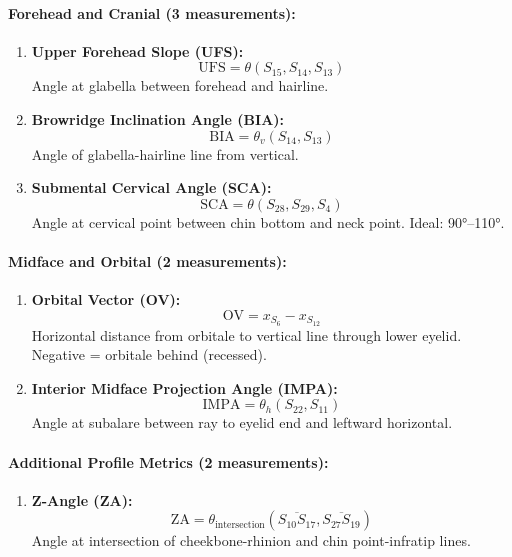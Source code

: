 \paragraph{Forehead and Cranial (3 measurements):}
\begin{enumerate}[resume]
    \item \textbf{Upper Forehead Slope (UFS):}
    \begin{equation}
    \text{UFS} = \theta(S_{15}, S_{14}, S_{13})
    \end{equation}
    Angle at glabella between forehead and hairline.
    
    \item \textbf{Browridge Inclination Angle (BIA):}
    \begin{equation}
    \text{BIA} = \theta_v(S_{14}, S_{13})
    \end{equation}
    Angle of glabella-hairline line from vertical.
    
    \item \textbf{Submental Cervical Angle (SCA):}
    \begin{equation}
    \text{SCA} = \theta(S_{28}, S_{29}, S_4)
    \end{equation}
    Angle at cervical point between chin bottom and neck point. Ideal: 90°--110°.
\end{enumerate}

\paragraph{Midface and Orbital (2 measurements):}
\begin{enumerate}[resume]
    \item \textbf{Orbital Vector (OV):}
    \begin{equation}
    \text{OV} = x_{S_6} - x_{S_{12}}
    \end{equation}
    Horizontal distance from orbitale to vertical line through lower eyelid. Negative = orbitale behind (recessed).
    
    \item \textbf{Interior Midface Projection Angle (IMPA):}
    \begin{equation}
    \text{IMPA} = \theta_h(S_{22}, S_{11})
    \end{equation}
    Angle at subalare between ray to eyelid end and leftward horizontal.
\end{enumerate}

\paragraph{Additional Profile Metrics (2 measurements):}
\begin{enumerate}[resume]
    \item \textbf{Z-Angle (ZA):}
    \begin{equation}
    \text{ZA} = \theta_{\text{intersection}}(\overline{S_{10}S_{17}}, \overline{S_{27}S_{19}})
    \end{equation}
    Angle at intersection of cheekbone-rhinion and chin point-infratip lines.
\end{enumerate}

